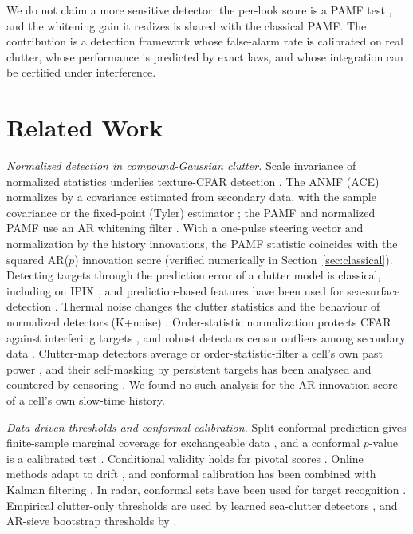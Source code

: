 \documentclass[journal]{IEEEtran}
\begin{document}
We do not claim a more sensitive detector: the per-look score is a PAMF test \cite{roman2000}, and the whitening gain it realizes is shared with the classical PAMF. The contribution is a detection framework whose false-alarm rate is calibrated on real clutter, whose performance is predicted by exact laws, and whose integration can be certified under interference.

\section{Related Work}
\emph{Normalized detection in compound-Gaussian clutter.} Scale invariance of normalized statistics underlies texture-CFAR detection \cite{conte1995,kraut1999,ollila2012,sangston2012}. The ANMF (ACE) normalizes by a covariance estimated from secondary data, with the sample covariance \cite{kraut1999} or the fixed-point (Tyler) estimator \cite{pascal2008fp}; the PAMF and normalized PAMF use an AR whitening filter \cite{roman2000,michels2000}. With a one-pulse steering vector and normalization by the history innovations, the PAMF statistic coincides with the squared AR($p$) innovation score (verified numerically in Section~\ref{sec:classical}). Detecting targets through the prediction error of a clutter model is classical, including on IPIX \cite{haykin1995}, and prediction-based features have been used for sea-surface detection \cite{dong2023jr}. Thermal noise changes the clutter statistics and the behaviour of normalized detectors (K+noise) \cite{watts1987,gini1997,watts2007cfarloss,ward2013,bocquet2015}. Order-statistic normalization protects CFAR against interfering targets \cite{rohling1983}, and robust detectors censor outliers among secondary data \cite{kononov2024}. Clutter-map detectors average or order-statistic-filter a cell's own past power \cite{lops1989,shan2002osmap}, and their self-masking by persistent targets has been analysed and countered by censoring \cite{naldi1999}. We found no such analysis for the AR-innovation score of a cell's own slow-time history.

\emph{Data-driven thresholds and conformal calibration.} Split conformal prediction gives finite-sample marginal coverage for exchangeable data \cite{lei2018,vovk2012}, and a conformal $p$-value is a calibrated test \cite{bates2023}. Conditional validity holds for pivotal scores \cite{dewolf2025}. Online methods adapt to drift \cite{gibbs2021aci}, and conformal calibration has been combined with Kalman filtering \cite{weisman2026ckf}. In radar, conformal sets have been used for target recognition \cite{nguyen2026spie}. Empirical clutter-only thresholds are used by learned sea-clutter detectors \cite{bai2026cvae,rouzoumka2026ood,qu2023sensors}, and AR-sieve bootstrap thresholds by \cite{qu2024sieve,qu2026sact}.
\end{document}
